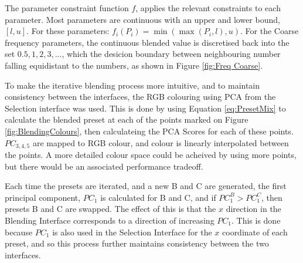 \documentclass[11pt, oneside]{report}   	%
\begin{document}
The parameter constraint function $f$, applies the relevant constraints to each parameter. Most parameters are continuous with an upper and lower bound, $[l, u]$. For these parameters: $f_i(P_i) = \min(\max(P_i, l), u)$. For the Coarse frequency parameters, the continuous blended value is discretised back into the set ${0.5, 1, 2, 3, ...}$, which the desicion boundary between neighbouring number falling equidistant to the numbers, as shown in Figure \ref{fig:Freq Coarse}.

To make the iterative blending process more intuitive, and to maintain consistency between the interfaces, the RGB colouring using PCA from the Selection interface was used. This is done by using Equation \ref{eq:PresetMix} to calculate the blended preset at each of the points marked on Figure \ref{fig:BlendingColours}, then calculateing the PCA Scores for each of these points. $PC_{3,4,5}$ are mapped to RGB colour, and colour is linearly interpolated between the points. A more detailed colour space could be acheived by using more points, but there would be an associated performance tradeoff. 

Each time the presets are iterated, and a new B and C are generated, the first principal component, $PC_{1}$ is calculated for B and C, and if $PC_{1}^B > PC_{1}^C $, then presets B and C are swapped. The effect of this is that the $x$ direction in the Blending Interface corresponds to a direction of increasing $PC_{1}$. This is done because $PC_{1}$ is also used in the Selection Interface for the $x$ coordinate of each preset, and so this process further maintains consistency between the two interfaces.
\end{document}
